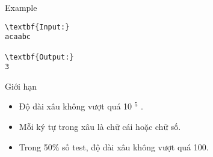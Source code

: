 Example
\begin{verbatim}
\textbf{Input:}
acaabc

\textbf{Output:}
3\end{verbatim}
Giới hạn
\begin{itemize}
	\item Độ dài xâu không vượt quá 10 $^ 5 $ .
	\item Mỗi ký tự trong xâu là chữ cái hoặc chữ số.
	\item Trong 50\% số test, độ dài xâu không vượt quá 100.
\end{itemize}